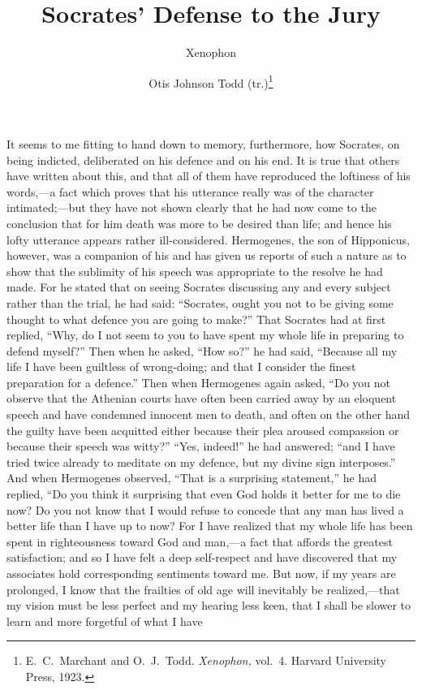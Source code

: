 \documentclass[12pt]{article}
\title{\Huge\swshape Socrates' Defense to the Jury}
\author{Xenophon \and Otis Johnson Todd (tr.)\footnote{E.~C.~Marchant and
O.~J.~Todd. \textit{Xenophon,} vol.~4. Harvard University Press, 1923.}}
\date{}
\begin{document}
\maketitle

\noindent It seems to me fitting to hand down to memory, furthermore, how
Socrates, on being indicted, deliberated on his defence and on his end. It is
true that others have written about this, and that all of them have reproduced
the loftiness of his words,---a fact which proves that his utterance really was
of the character intimated;---but they have not shown clearly that he had now
come to the conclusion that for him death was more to be desired than life; and
hence his lofty utterance appears rather ill-considered. Hermogenes, the son of
Hipponicus, however, was a companion of his and has given us reports of such a
nature as to show that the sublimity of his speech was appropriate to the
resolve he had made. For he stated that on seeing Socrates discussing any and
every subject rather than the trial, he had said: ``Socrates, ought you not to
be giving some thought to what defence you are going to make?'' That Socrates
had at first replied, ``Why, do I not seem to you to have spent my whole life
in preparing to defend myself?'' Then when he asked, ``How so?'' he had said,
``Because all my life I have been guiltless of wrong-doing; and that I consider
the finest preparation for a defence.'' Then when Hermogenes again asked, ``Do
you not observe that the Athenian courts have often been carried away by an
eloquent speech and have condemned innocent men to death, and often on the
other hand the guilty have been acquitted either because their plea aroused
compassion or because their speech was witty?'' ``Yes, indeed!'' he had
answered; ``and I have tried twice already to meditate on my defence, but my
divine sign interposes.'' And when Hermogenes observed, ``That is a surprising
statement,'' he had replied, ``Do you think it surprising that even God holds
it better for me to die now? Do you not know that I would refuse to concede
that any man has lived a better life than I have up to now? For I have realized
that my whole life has been spent in righteousness toward God and man,---a fact
that affords the greatest satisfaction; and so I have felt a deep self-respect
and have discovered that my associates hold corresponding sentiments toward me.
But now, if my years are prolonged, I know that the frailties of old age will
inevitably be realized,---that my vision must be less perfect and my hearing
less keen, that I shall be slower to learn and more forgetful of what I have
\end{document}
